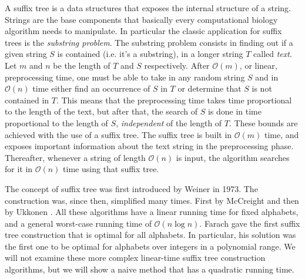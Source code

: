 \documentclass[a4paper,12pt, oneside]{article}
\begin{document}
A suffix tree is a data structures that exposes the internal structure of a string. Strings are the base components that basically every computational biology algorithm needs to manipulate. In particular the classic application for suffix trees is the \textit{substring problem}.\cite{gusfield} The substring problem consists in finding out if a given string $S$ is contained (i.e. it's a substring), in a longer string $T$ called \textit{text}. Let $m$ and $n$ be the length of $T$ and $S$ respectively. After $\mathcal{O}(m)$, or linear, preprocessing time, one must be able to take in any random string $S$ and in $\mathcal{O}(n)$ time either find an occurrence of $S$ in $T$ or determine that $S$ is not contained in $T$. This means that the preprocessing time takes time proportional to the length of the text, but after that, the search of $S$ is done in time proportional to the length of $S$, \textit{independent} of the length of $T$. These bounds are achieved with the use of a suffix tree. The suffix tree is built in $\mathcal{O}(m)$ time, and exposes important information about the text string in the preprocessing phase. Thereafter, whenever a string of length $\mathcal{O}(n)$ is input, the algorithm searches for it in $\mathcal{O}(n)$ time using that suffix tree. 
\par
The concept of suffix tree was first introduced by Weiner \cite{suffixtreeweiner} in 1973. The construction was, since then, simplified many times. First by McCreight \cite{suffixtreemccreight} and then by Ukkonen \cite{suffixtreeukkonen}. All these algorithms have a linear running time for fixed alphabets, and a general worst-case running time of $\mathcal{O}(n \log n)$. Farach \cite{suffixtreefarach} gave the first suffix tree construction that is optimal for all alphabets. In particular, his solution was the first one to be optimal for alphabets over integers in a polynomial range. We will not examine these more complex linear-time suffix tree construction algorithms, but we will show a naive method that has a quadratic running time.
\end{document}
